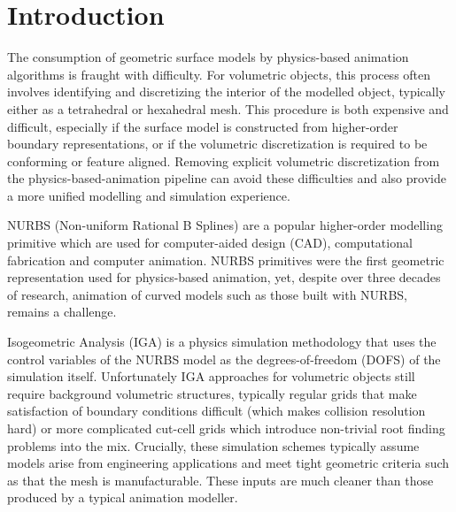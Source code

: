 \section{Introduction}

The consumption of geometric surface models by physics-based animation algorithms is fraught with difficulty. 
For volumetric objects, this process often involves identifying and discretizing the interior of the modelled object, 
typically either as a tetrahedral or hexahedral mesh.%
This procedure is both expensive and difficult, especially if the surface model is constructed from higher-order boundary
representations, or if the volumetric discretization is required to be conforming or feature aligned. 
Removing explicit volumetric discretization from the physics-based-animation pipeline can avoid these difficulties and 
also provide a more unified modelling and simulation experience. 

NURBS (Non-uniform Rational B Splines) are a popular higher-order modelling primitive which 
are used for computer-aided design (CAD), computational fabrication and computer animation. 
NURBS primitives were the first geometric representation used for physics-based animation, yet,
despite over three decades of research, animation of curved models such as those built with NURBS, remains a challenge.

Isogeometric Analysis (IGA) is a physics simulation methodology that uses the control variables of the NURBS model
as the degrees-of-freedom (DOFS) of the simulation itself. 
Unfortunately IGA approaches for volumetric objects still require background volumetric structures, typically
regular grids that make satisfaction of boundary conditions difficult (which makes collision resolution hard)
or more complicated cut-cell grids which introduce non-trivial root finding problems into the mix. 
Crucially, these simulation schemes typically assume models arise from engineering applications and meet tight geometric
criteria such as that the mesh is manufacturable. 
These inputs are much cleaner than those produced by a typical animation modeller. 


